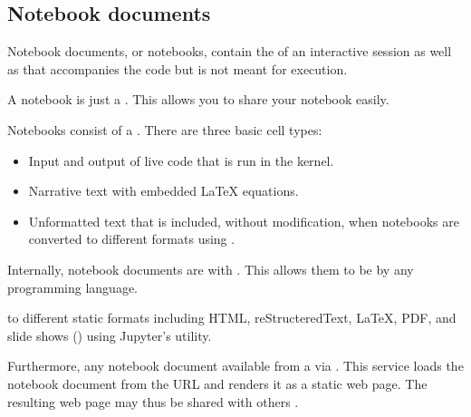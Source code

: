 \documentclass[letterpaper,10pt,english]{sphinxmanual}
\begin{document}
\subsection{Notebook documents}
\label{\detokenize{notebooks/Intro/Introduction2Jupyter:Notebook-documents}}
Notebook documents, or notebooks, contain the  of an interactive session as well as  that accompanies the code but is not meant for execution.

A notebook is just a . This allows you to share your notebook easily.

Notebooks consist of a . There are three basic cell types:
\begin{itemize}
\item {} 
 Input and output of live code that is run in the kernel.

\item {} 
 Narrative text with embedded LaTeX equations.

\item {} 
 Unformatted text that is included, without modification, when notebooks are converted to different formats using .

\end{itemize}

Internally, notebook documents are  with . This allows them to be  by any programming language.

 to different static formats including HTML, reStructeredText, LaTeX, PDF, and slide shows () using Jupyter’s  utility.

Furthermore, any notebook document available from a  via . This service loads the notebook document from the URL and renders it as a static web page. The resulting web page may thus be shared with others .
\end{document}
